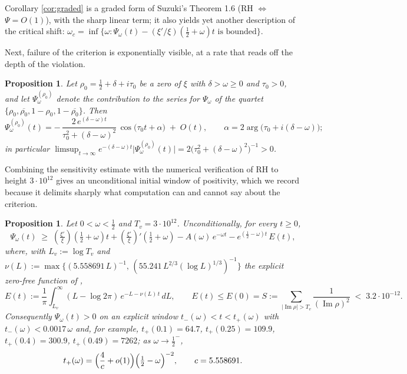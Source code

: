 \documentclass[11pt,reqno]{amsart}
\theoremstyle{plain}
\newtheorem{proposition}[theorem]{Proposition}
\theoremstyle{definition}
\newcommand{\Ip}{\operatorname{Im}}
\newcommand{\lxi}[1]{\left(\tfrac{\xi'}{\xi}\right)\!#1}
\begin{document}
Corollary \ref{cor:graded} is a graded form of Suzuki's Theorem 1.6 (RH $\Leftrightarrow$
$\Psi=O(1)$), with the sharp linear term; it also yields yet another description of the critical
shift: $\omega_c=\inf\{\omega:\Psi_\omega(t)-(\xi'/\xi)(\tfrac12+\omega)t\text{ is bounded}\}$.

Next, failure of the criterion is exponentially visible, at a rate that reads off the depth of
the violation.

\begin{proposition}\label{prop:sens}
Let $\rho_0=\tfrac12+\delta+i\tau_0$ be a zero of $\xi$ with $\delta>\omega\ge0$ and $\tau_0>0$, and
let $\Psi_\omega^{(\rho_0)}$ denote the contribution to the series for $\Psi_\omega$ of the quartet
$\{\rho_0,\overline{\rho_0},1-\rho_0,1-\overline{\rho_0}\}$. Then
\[
  \Psi_\omega^{(\rho_0)}(t)
  = -\,\frac{2\,e^{(\delta-\omega)t}}{\tau_0^{2}+(\delta-\omega)^{2}}\,
     \cos\bigl(\tau_0 t+\alpha\bigr)\;+\;O(t),
  \qquad \alpha=2\arg\bigl(\tau_0+i(\delta-\omega)\bigr);
\]
in particular
$\limsup_{t\to\infty}e^{-(\delta-\omega)t}\bigl|\Psi_\omega^{(\rho_0)}(t)\bigr|
 =2\bigl(\tau_0^{2}+(\delta-\omega)^{2}\bigr)^{-1}>0$.
\end{proposition}

Combining the sensitivity estimate with the numerical verification of RH to height $3\cdot10^{12}$
\cite{PlattTrudgian} gives an unconditional initial window of positivity, which we record because it
delimits sharply what computation can and cannot say about the criterion.

\begin{proposition}\label{prop:window}
Let $0<\omega<\tfrac12$ and $T_v=3\cdot10^{12}$. Unconditionally, for every $t\ge0$,
\[
  \Psi_\omega(t)\;\ge\;\lxi{\left(\tfrac12+\omega\right)}t+\lxi{'\left(\tfrac12+\omega\right)}
  -A(\omega)\,e^{-\omega t}-e^{(\frac12-\omega)t}\,E(t),
\]
where, with $L_v:=\log T_v$ and
$\nu(L):=\max\bigl\{(5.558691\,L)^{-1},\,(55.241\,L^{2/3}(\log L)^{1/3})^{-1}\bigr\}$ the explicit
zero-free function of \cite{MTY},
\[
  E(t):=\frac1\pi\int_{L_v}^{\infty}(L-\log2\pi)\,e^{-L-\nu(L)\,t}\,dL,
  \qquad
  E(t)\le E(0)=S:=\!\!\sum_{|\Ip\rho|>T_v}\!\!\frac{1}{(\Ip\rho)^{2}}\;<\;3.2\cdot10^{-12}.
\]
Consequently $\Psi_\omega(t)>0$ on an explicit window $t_{-}(\omega)<t<t_{+}(\omega)$ with
$t_{-}(\omega)<0.0017\,\omega$ and, for example, $t_{+}(0.1)=64.7$, $t_{+}(0.25)=109.9$,
$t_{+}(0.4)=300.9$, $t_{+}(0.49)=7262$; as $\omega\to\tfrac12^{-}$,
\[
  t_{+}(\omega)=\Bigl(\frac4c+o(1)\Bigr)\Bigl(\tfrac12-\omega\Bigr)^{-2},
  \qquad c=5.558691 .
\]
\end{proposition}
\end{document}
